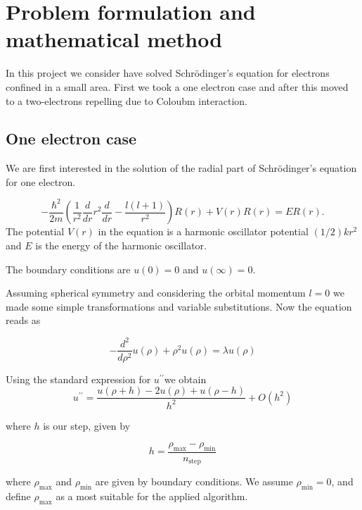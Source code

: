\documentclass[10pt]{article}
\begin{document}
\newpage
\section{Problem formulation and mathematical method}\label{Part1}
In this project we consider have solved Schr\"{o}dinger's equation for electrons confined in a small area. First we took a one electron case and after this moved to a two-electrons repelling due to Coloubm interaction. 

\subsection{One electron case}
We are first interested in the solution of the radial part of Schr\"{o}dinger's equation for one electron. 

\begin{equation*}
  -\frac{\hbar^2}{2 m} \left ( \frac{1}{r^2} \frac{d}{dr} r^2
  \frac{d}{dr} - \frac{l (l + 1)}{r^2} \right )R(r) 
     + V(r) R(r) = E R(r).
\end{equation*}
The potential $V(r)$  in the equation is a harmonic oscillator potential $(1/2)kr^2$ and $E$ is the energy of the harmonic oscillator. 

The boundary conditions are $u(0)=0$ and $u(\infty)=0$.

Assuming spherical symmetry and considering the orbital momentum $l=0$ we made some simple transformations and variable substitutions. Now the equation reads as


\begin{equation}
-\frac{d^{2}}{d\rho ^{2}}u(\rho )+\rho ^{2}u(\rho )=\lambda u(\rho )
\end{equation}

Using the standard expression for $u^{\prime \prime }$we obtain 
\begin{equation}
u^{\prime \prime }=\frac{u(\rho +h)-2u(\rho )+u(\rho -h)}{h^{2}}+O(h^{2})
\end{equation}

where $h$ is our step, given by

\begin{equation}
h=\frac{\rho _{\mathrm{max}}-\rho _{\mathrm{min}}}{n_{\mathrm{step}}}
\end{equation}

where $\rho _{\mathrm{max}}$ and $\rho _{\mathrm{min}}$ are given by boundary conditions. We assume $\rho _{\mathrm{min}}=0$, and define $\rho_{\mathrm{max}}$ as a most suitable for the applied algorithm.
\end{document}
